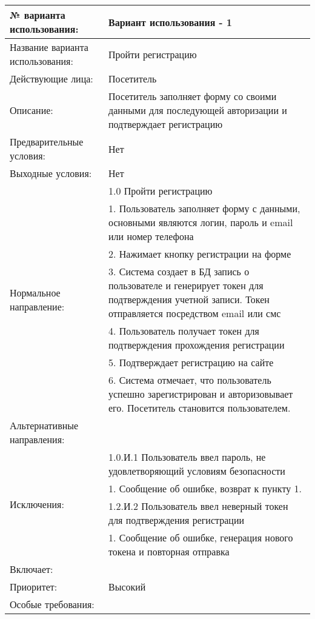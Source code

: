 \begin{table}[H]
  \caption{Вариант использования - 1 – Пройти регистрацию}\label{use-case-1-table}
  \begin{longtable}{|p{6cm}|p{10cm}|}
  \hline № варианта использования: & Вариант использования - 1 \\
  \hline Название варианта использования: & Пройти регистрацию \\
  \hline Действующие лица: & Посетитель \\
  \hline Описание: & Посетитель заполняет форму со своими данными для последующей авторизации и подтверждает регистрацию \\
  \hline Предварительные условия: & Нет \\
  \hline Выходные условия: & Нет \\
  \hline \multirow{7}{*}{Нормальное направление:} & 1.0  Пройти регистрацию \\
  \cline{2-2} & 1. Пользователь заполняет форму с данными, основными являются логин, пароль и email или номер телефона \\
  \cline{2-2} & 2. Нажимает кнопку регистрации на форме \\
  \cline{2-2} & 3. Система создает в БД запись о пользователе и генерирует токен для подтверждения учетной записи. Токен отправляется посредством email или смс \\
  \cline{2-2} & 4. Пользователь получает токен для подтверждения прохождения регистрации \\
  \cline{2-2} & 5. Подтверждает регистрацию на сайте \\
  \cline{2-2} & 6. Система отмечает, что пользователь успешно зарегистрирован и авторизовывает его. Посетитель становится пользователем. \\
  \hline Альтернативные направления: &  \\
  \hline \multirow{4}{*}{Исключения:} & 1.0.И.1 Пользователь ввел пароль, не удовлетворяющий условиям безопасности \\
  \cline{2-2} & 1. Сообщение об ошибке, возврат к пункту 1. \\
  \cline{2-2} & 1.2.И.2 Пользователь ввел неверный токен для подтверждения регистрации \\
  \cline{2-2} & 1. Сообщение об ошибке, генерация нового токена и повторная отправка \\
  \hline Включает: &  \\
  \hline Приоритет: & Высокий \\
  \hline Особые требования: &  \\
  \hline
  \end{longtable}
\end{table}

